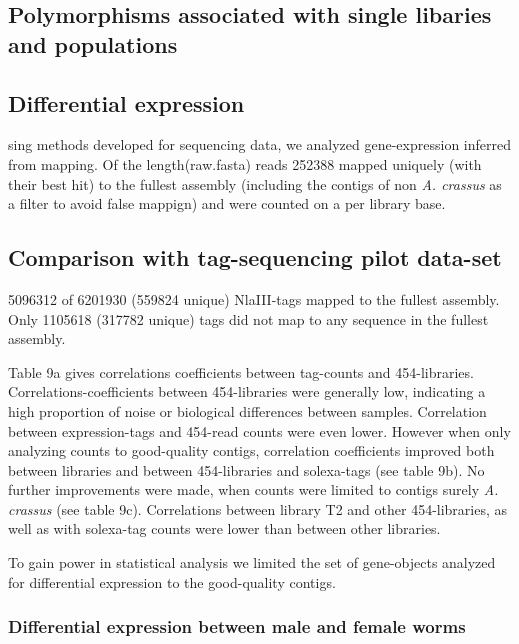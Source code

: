 \documentclass[10pt]{bmc_article}
\newenvironment{bmcformat}{\begin{raggedright}\baselineskip20pt\sloppy\setboolean{publ}{false}}{\end{raggedright}\baselineskip20pt\sloppy}
\begin{document}
\begin{bmcformat}
\subsection*{Polymorphisms associated with single libaries and
  populations}





\subsection*{Differential expression}
                

sing methods developed for sequencing data, we analyzed
gene-expression inferred from mapping. Of the {length(raw.fasta)}
reads 252388 mapped uniquely (with their best hit) to the
fullest assembly (including the contigs of non \textit{A. crassus} as
a filter to avoid false mappign) and were counted on a per library
base.

\subsection*{Comparison with tag-sequencing pilot data-set}

5096312 of 6201930 (559824 unique) NlaIII-tags
mapped to the fullest assembly. Only 1105618
(317782 unique) tags did not map to any sequence in the
fullest assembly.

Table 9a gives correlations coefficients between tag-counts and
454-libraries. Correlations-coefficients between 454-libraries were
generally low, indicating a high proportion of noise or biological
differences between samples. Correlation between expression-tags and
454-read counts were even lower. However when only analyzing counts to
good-quality contigs, correlation coefficients improved both between
libraries and between 454-libraries and solexa-tags (see table 9b). No
further improvements were made, when counts were limited to contigs
surely \textit{A. crassus} (see table 9c). Correlations between
library T2 and other 454-libraries, as well as with solexa-tag counts
were lower than between other libraries.

To gain power in statistical analysis we limited the set of
gene-objects analyzed for differential expression to the good-quality
contigs.

\subsubsection*{Differential expression between male and female worms}


\end{bmcformat}
\end{document}
